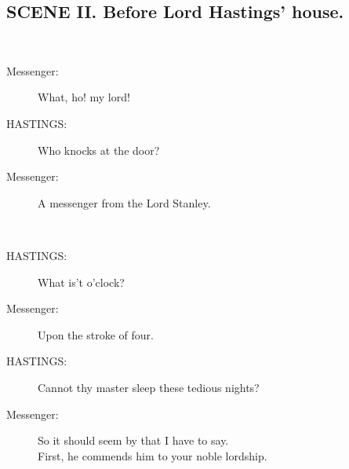 \documentclass{article}
\begin{document}
\subsection*{SCENE II.  Before Lord Hastings' house.}
\\
\begin{description}
\item[Messenger:] 
\hspace{1pt}What, ho! my lord!\\
\end{description}
\begin{description}
\item[HASTINGS:] 
\hspace{1pt}  Who knocks at the door?\\
\end{description}
\begin{description}
\item[Messenger:] 
\hspace{1pt}A messenger from the Lord Stanley.\\
\end{description}
\\
\begin{description}
\item[HASTINGS:] 
\hspace{1pt}What is't o'clock?\\
\end{description}
\begin{description}
\item[Messenger:] 
\hspace{1pt}Upon the stroke of four.\\
\end{description}
\begin{description}
\item[HASTINGS:] 
\hspace{1pt}Cannot thy master sleep these tedious nights?\\
\end{description}
\begin{description}
\item[Messenger:] 
\hspace{1pt}So it should seem by that I have to say.\\
\hspace{1pt}First, he commends him to your noble lordship.\\
\end{description}
\end{document}
